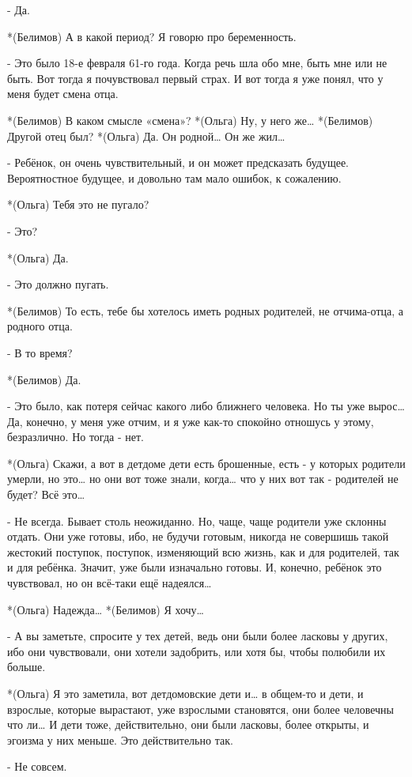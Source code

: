 - Да.

*(Белимов) А в какой период? Я говорю про беременность.

- Это было 18-е февраля 61-го года. Когда речь шла обо мне, быть мне или не быть. Вот тогда я почувствовал первый страх. И вот тогда я уже понял, что у меня будет смена отца.

*(Белимов) В каком смысле «смена»?
*(Ольга) Ну, у него же…
*(Белимов) Другой отец был?
*(Ольга) Да. Он родной… Он же жил…

- Ребёнок, он очень чувствительный, и он может предсказать будущее. Вероятностное будущее, и довольно там мало ошибок, к сожалению.

*(Ольга) Тебя это не пугало?

- Это?

*(Ольга) Да.

- Это должно пугать.

*(Белимов) То есть, тебе бы хотелось иметь родных родителей, не отчима-отца, а родного отца.

- В то время?

*(Белимов) Да.

- Это было, как потеря сейчас какого либо ближнего человека. Но ты уже вырос… Да, конечно, у меня уже отчим, и я уже как-то спокойно отношусь у этому, безразлично. Но тогда - нет.

*(Ольга) Скажи, а вот в детдоме дети есть брошенные, есть - у которых родители умерли, но это… но они вот тоже знали, когда… что у них вот так - родителей не будет? Всё это…

- Не всегда. Бывает столь неожиданно. Но, чаще, чаще родители уже склонны отдать. Они уже готовы, ибо, не будучи готовым, никогда не совершишь такой жестокий поступок, поступок, изменяющий всю жизнь, как и для родителей, так и для ребёнка. Значит, уже были изначально готовы. И, конечно, ребёнок это чувствовал, но он всё-таки ещё надеялся…

*(Ольга) Надежда…
*(Белимов) Я хочу…

- А вы заметьте, спросите у тех детей, ведь они были более ласковы у других, ибо они чувствовали, они хотели задобрить, или хотя бы, чтобы полюбили их больше.

*(Ольга) Я это заметила, вот детдомовские дети и… в общем-то и дети, и взрослые, которые вырастают, уже взрослыми становятся, они более человечны что ли… И дети тоже, действительно, они были ласковы, более открыты, и эгоизма у них меньше. Это действительно так.

- Не совсем.

